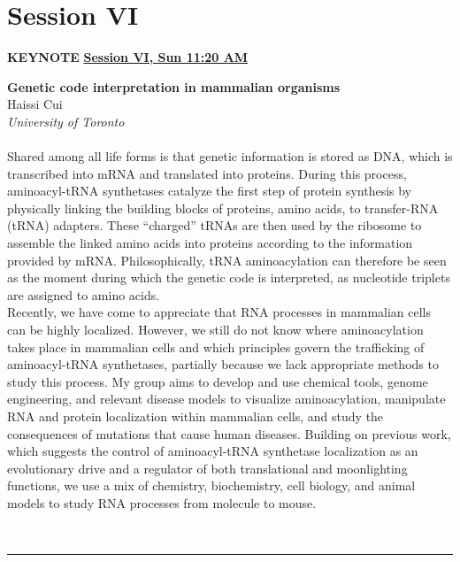\documentclass[titlepage,oneside,openany,10pt]{book}
\newenvironment{oralabskeynote}[3]
        {
        \vspace{0.3cm}
        \noindent\textbf{#1}\\%
        #2\\%
        \textit{#3}\\\\%
        }
        {
        \\
        \noindent\rule{15cm}{0.5pt}%
        }
\begin{document}
\newpage

\section*{Session VI}
\label{sec:sessVI}

\vspace{0.5cm}

\begin{shaded}
\noindent\textbf{KEYNOTE} \hfill \textbf{\underline{Session VI, Sun 11:20 AM}}

\begin{oralabskeynote}
	{Genetic code interpretation in mammalian organisms}
	{Haissi Cui}
	{University of Toronto}
	Shared among all life forms is that genetic information is stored as 
	DNA, which is transcribed into mRNA and translated into proteins. During this
	process, aminoacyl-tRNA synthetases catalyze the first step of protein 
	synthesis by physically linking the building blocks of proteins, amino acids, to
	transfer-RNA (tRNA) adapters. These “charged” tRNAs are then used by the 
	ribosome to assemble the linked amino acids into proteins according to the 
	information provided by mRNA. Philosophically, tRNA aminoacylation can 
	therefore be seen as the moment during which the genetic code is 
	interpreted, as nucleotide triplets are assigned to amino acids. \\
	Recently, we have come to appreciate that RNA processes in 
	mammalian cells can be highly localized. However, we still do not know 
	where aminoacylation takes place in mammalian cells and which principles 
	govern the trafficking of aminoacyl-tRNA synthetases, partially because we 
	lack appropriate methods to study this process. My group aims to develop 
	and use chemical tools, genome engineering, and relevant disease models to
	visualize aminoacylation, manipulate RNA and protein localization within 
	mammalian cells, and study the consequences of mutations that cause 
	human diseases. Building on previous work, which suggests the control of 
	aminoacyl-tRNA synthetase localization as an evolutionary drive and a 
	regulator of both translational and moonlighting functions, we use a mix of 
	chemistry, biochemistry, cell biology, and animal models to study RNA 
	processes from molecule to mouse.
	\label{CuiH}
\end{oralabskeynote}
\end{shaded}
	
\end{document}
